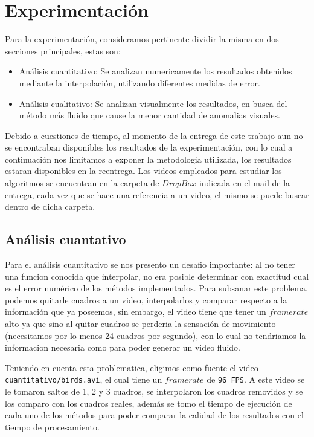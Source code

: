 \section{Experimentación}

Para la experimentación, consideramos pertinente dividir la misma en dos secciones principales, estas son:

\begin{itemize}
	\item Análisis cuantitativo: Se analizan numericamente los resultados obtenidos mediante la interpolación, utilizando diferentes medidas de error.
	\item Análisis cualitativo: Se analizan visualmente los resultados, en busca del método más fluido que cause la menor cantidad de anomalias visuales.
\end{itemize}

Debido a cuestiones de tiempo, al momento de la entrega de este trabajo aun no se encontraban disponibles los resultados de la experimentación, con lo cual a continuación nos limitamos a exponer la metodologia utilizada, los resultados estaran disponibles en la reentrega. Los videos empleados para estudiar los algoritmos se encuentran en la carpeta de $DropBox$ indicada en el mail de la entrega, cada vez que se hace una referencia a un video, el mismo se puede buscar dentro de dicha carpeta.

\subsection{Análisis cuantativo}

Para el análisis cuantitativo se nos presento un desafio importante: al no tener una funcion conocida que interpolar, no era posible determinar con exactitud cual es el error numérico de los métodos implementados. Para subsanar este problema, podemos quitarle cuadros a un video, interpolarlos y comparar respecto a la información que ya poseemos, sin embargo, el video tiene que tener un $framerate$ alto ya que sino al quitar cuadros se perderia la sensación de movimiento (necesitamos por lo menos 24 cuadros por segundo), con lo cual no tendriamos la informacion necesaria como para poder generar un video fluido.

Teniendo en cuenta esta problematica, eligimos como fuente el video \texttt{cuantitativo/birds.avi}, el cual tiene un $framerate$ de \texttt{96 FPS}. A este video se le tomaron saltos de 1, 2 y 3 cuadros, se interpolaron los cuadros removidos y se los comparo con los cuadros reales, además se tomo el tiempo de ejecución de cada uno de los métodos para poder comparar la calidad de los resultados con el tiempo de procesamiento.


